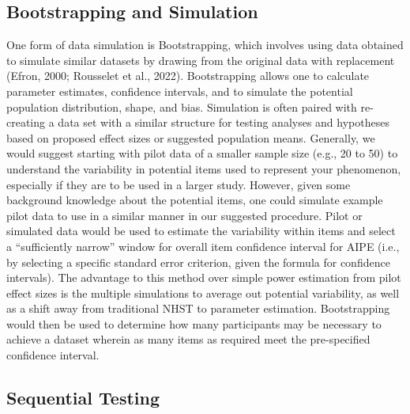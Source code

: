 \documentclass[
  man]{apa7}
\begin{document}
\hypertarget{bootstrapping-and-simulation}{%
\subsection{Bootstrapping and Simulation}\label{bootstrapping-and-simulation}}

One form of data simulation is Bootstrapping, which involves using data obtained to simulate similar datasets by drawing from the original data with replacement (Efron, 2000; Rousselet et al., 2022). Bootstrapping allows one to calculate parameter estimates, confidence intervals, and to simulate the potential population distribution, shape, and bias. Simulation is often paired with re-creating a data set with a similar structure for testing analyses and hypotheses based on proposed effect sizes or suggested population means. Generally, we would suggest starting with pilot data of a smaller sample size (e.g., 20 to 50) to understand the variability in potential items used to represent your phenomenon, especially if they are to be used in a larger study. However, given some background knowledge about the potential items, one could simulate example pilot data to use in a similar manner in our suggested procedure. Pilot or simulated data would be used to estimate the variability within items and select a ``sufficiently narrow'' window for overall item confidence interval for AIPE (i.e., by selecting a specific standard error criterion, given the formula for confidence intervals). The advantage to this method over simple power estimation from pilot effect sizes is the multiple simulations to average out potential variability, as well as a shift away from traditional NHST to parameter estimation. Bootstrapping would then be used to determine how many participants may be necessary to achieve a dataset wherein as many items as required meet the pre-specified confidence interval.

\hypertarget{sequential-testing}{%
\subsection{Sequential Testing}\label{sequential-testing}}
\end{document}

